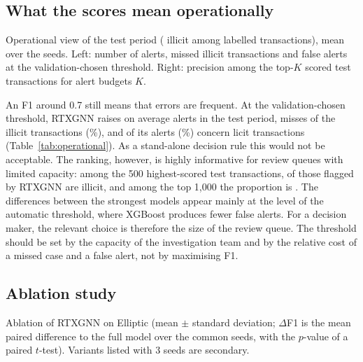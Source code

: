 \subsection{What the scores mean operationally}
\label{subsec:operational}

\begin{table}[!t]
\centering
\caption{Operational view of the test period (\nTestIllicit{} illicit among \nTest{} labelled transactions), mean over the seeds. Left: number of alerts, missed illicit transactions and false alerts at the validation-chosen threshold. Right: precision among the top-$K$ scored test transactions for alert budgets $K$.}
\label{tab:operational}
\footnotesize
\begin{adjustbox}{max width=\textwidth}\end{adjustbox}
\end{table}

An F1 around 0.7 still means that errors are frequent. At the validation-chosen threshold, RTXGNN raises on average \rtxAlerts{} alerts in the test period, misses \rtxMissed{} of the \nTestIllicit{} illicit transactions (\rtxMissPct\%), and \rtxFalse{} of its alerts (\rtxFDRPct\%) concern licit transactions (Table~\ref{tab:operational}). As a stand-alone decision rule this would not be acceptable. The ranking, however, is highly informative for review queues with limited capacity: among the 500 highest-scored test transactions, \rtxPrecAtFive{} of those flagged by RTXGNN are illicit, and among the top 1,000 the proportion is \rtxPrecAtThousand. The differences between the strongest models appear mainly at the level of the automatic threshold, where XGBoost produces fewer false alerts. For a decision maker, the relevant choice is therefore the size of the review queue. The threshold should be set by the capacity of the investigation team and by the relative cost of a missed case and a false alert, not by maximising F1.

\subsection{Ablation study}
\label{subsec:ablation}

\begin{table}[!t]
\centering
\caption{Ablation of RTXGNN on Elliptic (mean $\pm$ standard deviation; $\Delta$F1 is the mean paired difference to the full model over the common seeds, with the $p$-value of a paired $t$-test). Variants listed with 3 seeds are secondary.}
\label{tab:ablation}
\footnotesize
\begin{adjustbox}{max width=\textwidth}\end{adjustbox}
\end{table}

